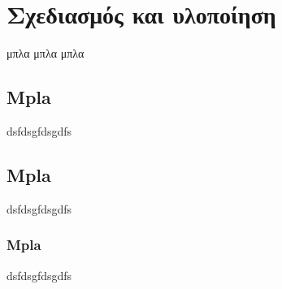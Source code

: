 \chapter{Σχεδιασμός και υλοποίηση}
μπλα μπλα μπλα

\section{Mpla}
dsfdsgfdsgdfs

\section{Mpla}
dsfdsgfdsgdfs
\subsection{Mpla}
dsfdsgfdsgdfs


